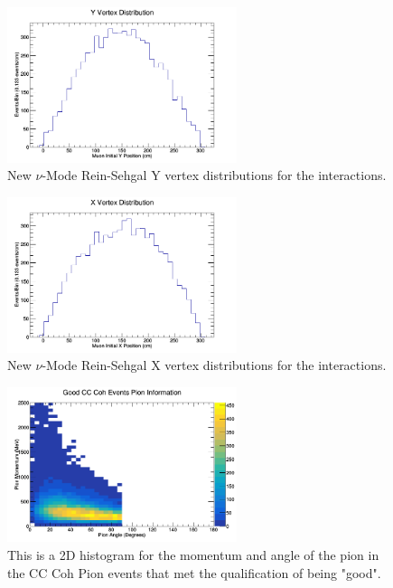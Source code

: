 \documentclass[11pt]{article}
\begin{document}
\begin{figure}[H]
\centering
\includegraphics[width=0.6\textwidth]{NewNMReinSehgalImages/3-YVertexDistributionNMRS.png}
\caption{New $\nu$-Mode Rein-Sehgal Y vertex distributions for the interactions.}
\end{figure}

\begin{figure}[H]
\centering
\includegraphics[width=0.6\textwidth]{NewNMReinSehgalImages/4-XVertexDistributionNMRS.png}
\caption{New $\nu$-Mode Rein-Sehgal X vertex distributions for the interactions.}
\end{figure}

\begin{figure}[H]
\centering
\includegraphics[width=0.6\textwidth]{NewNMReinSehgalImages/5-GoodCCCohPionInfoNMRS.png}
\caption{This is a 2D histogram for the momentum and angle of the pion in the CC Coh Pion events that met the qualification of being "good".}
\end{figure}
\end{document}

